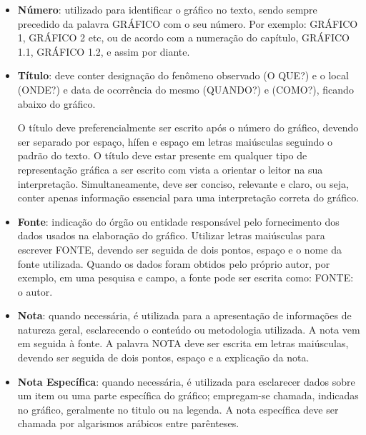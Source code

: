 \begin{itemize}
\item \textbf{Número}: utilizado para identificar o gráfico no texto, sendo sempre precedido da palavra GRÁFICO com o seu número. Por exemplo: GRÁFICO 1, GRÁFICO 2 etc, ou de acordo com a numeração do capítulo, GRÁFICO 1.1, GRÁFICO 1.2, e assim por diante. \item \textbf{Título}: deve conter designação do fenômeno observado (O QUE?) e o local (ONDE?) e data de ocorrência do mesmo (QUANDO?) e (COMO?), ficando abaixo do gráfico. 


O título deve preferencialmente ser escrito após o número do gráfico, devendo ser separado por espaço, hífen e espaço em letras maiúsculas seguindo o padrão do texto. O título deve estar presente em qualquer tipo de representação gráfica a ser escrito com vista a orientar o leitor na sua interpretação. Simultaneamente, deve ser conciso, relevante e claro, ou seja, conter apenas informação essencial para uma interpretação correta do gráfico. 
\item \textbf{Fonte}: indicação do órgão ou entidade responsável pelo fornecimento dos dados usados na elaboração do gráfico. Utilizar letras maiúsculas para escrever FONTE, devendo ser seguida de dois pontos, espaço e o nome da fonte utilizada. Quando os dados foram obtidos pelo próprio autor, por exemplo, em uma pesquisa e campo, a fonte pode ser escrita como: FONTE: o autor. 
\item \textbf{Nota}: quando necessária, é utilizada para a apresentação de informações de natureza geral, esclarecendo o conteúdo ou metodologia utilizada. A nota vem em seguida à fonte. A palavra NOTA deve ser escrita em letras maiúsculas, devendo ser seguida de dois pontos, espaço e a explicação da nota. 
\item \textbf{Nota Específica}: quando necessária, é utilizada para esclarecer dados sobre um item ou uma parte específica do gráfico; empregam-se chamada, indicadas no gráfico, geralmente no titulo ou na legenda. A nota específica deve ser chamada por algarismos arábicos entre parênteses.


\end{itemize}

